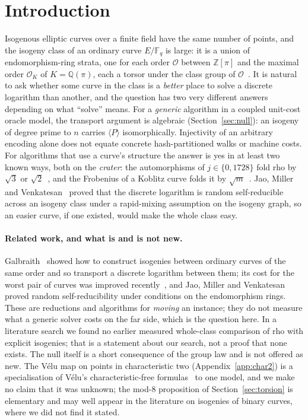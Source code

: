 \documentclass[10pt,a4paper]{article}
\theoremstyle{remark}
\newcommand{\FF}{\mathbb{F}}
\newcommand{\ZZ}{\mathbb{Z}}
\newcommand{\QQ}{\mathbb{Q}}
\newcommand{\OO}{\mathcal{O}}
\begin{document}
\section{Introduction}

Isogenous elliptic curves over a finite field have the same number of points,
and the isogeny class of an ordinary curve $E/\FF_q$ is large: it is a union
of endomorphism-ring strata, one for each order $\OO$ between $\ZZ[\pi]$ and
the maximal order $\OO_K$ of $K = \QQ(\pi)$, each a torsor under the class
group of $\OO$~\cite{Kohel1996,FouquetMorain2002,Sutherland2013}. It is
natural to ask whether some curve in the class is a \emph{better} place to
solve a discrete logarithm than another, and the question has two very
different answers depending on what ``solve'' means. For a \emph{generic}
algorithm in a coupled unit-cost oracle model, the transport argument is
algebraic (Section~\ref{sec:null}): an isogeny of degree prime to $n$ carries
$\langle P\rangle$ isomorphically. Injectivity of an arbitrary encoding
alone does not equate concrete hash-partitioned walks or machine costs.
For algorithms that use a curve's structure the answer
is yes in at least two known ways, both on the \emph{crater}: the
automorphisms of $j \in \{0, 1728\}$ fold rho by $\sqrt{3}$ or
$\sqrt{2}$~\cite{DuursmaGaudryMorain1999,WienerZuccherato1998}, and the
Frobenius of a Koblitz curve folds it by
$\sqrt{m}$~\cite{GallantLambertVanstone2000,WienerZuccherato1998}. Jao, Miller
and Venkatesan~\cite{JaoMillerVenkatesan2005} proved that the discrete logarithm
is random self-reducible across an isogeny class under a rapid-mixing
assumption on the isogeny graph, so an easier curve, if one existed, would
make the whole class easy.

\paragraph{Related work, and what is and is not new.} Galbraith~\cite{Galbraith1999}
showed how to construct isogenies between ordinary curves of the same order
and so transport a discrete logarithm between them; its cost for the worst
pair of curves was improved recently~\cite{Galbraith2024}, and Jao, Miller and
Venkatesan~\cite{JaoMillerVenkatesan2005} proved random self-reducibility
under conditions on the endomorphism rings. These are reductions and
algorithms for \emph{moving} an instance; they do not measure what a generic
solver costs on the far side, which is the question here. In a literature
search we found no earlier measured whole-class comparison of rho with
explicit isogenies; that is a statement about our search, not a proof that
none exists. The null itself is a short consequence of the group law and is
not offered as new. The V\'elu map on points in characteristic two
(Appendix~\ref{app:char2}) is a specialisation of V\'elu's characteristic-free
formulas~\cite{Velu1971} to one model, and we make no claim that it was
unknown; the mod-$8$ proposition of Section~\ref{sec:torsion} is elementary
and may well appear in the literature on isogenies of binary curves, where we
did not find it stated.
\end{document}
